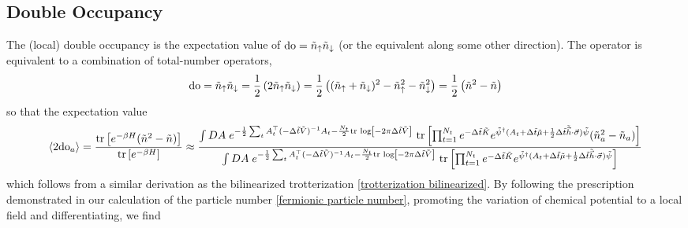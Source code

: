 \subsection{Double Occupancy}\label{sec:double occupancy}

The (local) double occupancy is the expectation value of $\textrm{do}=\tilde{n}_{\uparrow} \tilde{n}_{\downarrow}$ (or the equivalent along some other direction).
The \doubleOccupancy operator is equivalent to a combination of total-number operators,
\begin{align}
    \textrm{do}
    = \tilde{n}_{\uparrow} \tilde{n}_{\downarrow}
    = \frac{1}{2} \left(2 \tilde{n}_{\uparrow} \tilde{n}_{\downarrow} \right)
    = \frac{1}{2} \left( (\tilde{n}_{\uparrow} + \tilde{n}_{\downarrow})^2 - \tilde{n}_{\uparrow}^2 - \tilde{n}_{\downarrow}^2\right)
    = \frac{1}{2} \left( \tilde{n}^2 - \tilde{n} \right)
\end{align}
so that the expectation value
\begin{align}
    \left\langle 2\textrm{do}_a \right\rangle
    =
    \frac{\text{tr}\left[e^{-\beta H}(\tilde{n}^2 - \tilde{n})\right]}{\text{tr}\left[e^{-\beta H}\right]}
    \approx
    \frac{ \int DA\; e^{-\frac{1}{2} \sum_t A{}^{\top}_t (-\Delta\tilde{t} \tilde{V})^{-1} A_t - \frac{N_t}{2} \text{tr log}\left[ -2\pi \Delta\tilde{t}\tilde{V}\right]}
    ~\text{tr}\left[\prod_{t=1}^{N_t} e^{-\Delta \tilde{t}\tilde{K}}  e^{ \tilde{\psi}{}^{\dagger} (A_t + \Delta\tilde{t} \tilde{\mu} + \frac{1}{2} \Delta\tilde{t} \tilde{\vec{h}}\cdot\vec{\sigma})\tilde{\psi}} (\tilde{n}^2_a - \tilde{n}_a)\right] 
    }{
    \int DA\; e^{-\frac{1}{2} \sum_t A{}^{\top}_t (-\Delta\tilde{t} \tilde{V})^{-1} A_t - \frac{N_t}{2} \text{tr log}\left[ -2\pi \Delta\tilde{t}\tilde{V}\right]}
    ~\text{tr}\left[\prod_{t=1}^{N_t} e^{-\Delta \tilde{t}\tilde{K}}  e^{ \tilde{\psi}{}^{\dagger} (A_t + \Delta\tilde{t} \tilde{\mu} + \frac{1}{2} \Delta\tilde{t} \tilde{\vec{h}}\cdot\vec{\sigma})\tilde{\psi}}\right] 
    }
\end{align}
which follows from a similar derivation as the bilinearized trotterization \eqref{trotterization bilinearized}.
By following the prescription demonstrated in our calculation of the particle number \eqref{fermionic particle number}, promoting the variation of chemical potential to a local field and differentiating, we find
